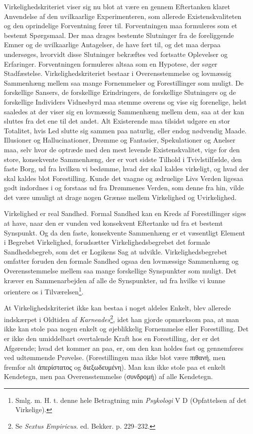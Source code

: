 \documentclass[12pt,a4paper]{book}
\newcommand{\apage}[1]{\marginnote{\footnotesize\textit{[#1]}}}
\begin{document}
Virkelighedskriteriet viser sig nu blot at være en gennem Eftertanken
klaret Anvendelse af den uvilkaarlige Experimenteren, som allerede
Existenskvaliteten og den oprindelige Forventning fører til.
Forventningen maa formuleres som et bestemt Spørgsmaal. Der maa drages
bestemte Slutninger fra de foreliggende Emner og de uvilkaarlige
Antagelser, de have ført til, og det maa derpaa undersøges, hvorvidt
disse Slutninger bekræftes ved fortsatte Oplevelser og Erfaringer.
Forventningen formuleres altsaa som en Hypotese, der søger Stadfæstelse.
Virkelighedskriteriet bestaar i Overensstemmelse og lovmæssig
Sammenhæng mellem saa mange Fornemmelser og Forestillinger som muligt.
De forskellige Sansers, de forskellige Erindringers, de forskellige
Slutningers og de forskellige Individers Vidnesbyrd maa stemme overens
og vise sig forenelige, helst saaledes at der viser sig en lovmæssig
Sammenhæng mellem dem, saa at der kan sluttes fra det ene til det andet.
Alt Existerende maa tilsidst udgøre \apage{104} en stor Totalitet, hvis Led slutte
sig sammen paa naturlig, eller endog nødvendig Maade. Illusioner og
Hallucinationer, Drømme og Fantasier, Spekulationer og Anelser maa, selv
hvor de optræde med den mest levende Existenskvalitet, vige for den
store, konsekvente Sammenhæng, der er vort sidste Tilhold i
Tvivlstilfælde, den faste Borg, ud fra hvilken vi bedømme, hvad der skal
kaldes virkeligt, og hvad der skal kaldes blot Forestilling. Kunde det
vaagne og ædruelige Livs Verden ligesaa godt indordnes i og forstaas ud
fra Drømmenes Verden, som denne fra hin, vilde det være umuligt at drage
nogen Grænse mellem Virkelighed og Uvirkelighed.

Virkelighed er real Sandhed. Formal Sandhed kan en Kreds af
Forestillinger siges at have, naar den er vunden ved konsekvent
Eftertanke ud fra et bestemt Synspunkt. Og da den faste, konsekvente
Sammenhæng er et væsentligt Element i Begrebet Virkelighed, forudsætter
Virkelighedsbegrebet det formale Sandhedsbegreb, som det er Logikens Sag
at udvikle. Virkelighedsbegrebet omfatter foruden den formale Sandhed
ogsaa den lovmæssige Sammenhæng og Overensstemmelse mellem saa mange
forskellige Synspunkter som muligt. Det kræver en Sammenarbejden af alle
de Synspunkter, ud fra hvilke vi kunne orientere os i
Tilværelsen\footnote{Smlg. m. H. t. denne hele Betragtning min
\emph{Psykologi} V D (Opfattelsen af det Virkelige).}.

At Virkelighedskriteriet ikke kan bestaa i noget aldeles Enkelt, blev
allerede indskærpet i Oldtiden af \emph{Karneades}\footnote{Se
\emph{Sextus Empiricus}. ed. Bekker. p. 229--232.}, idet han gjorde
opmærksom paa, at man ikke kan stole paa nogen enkelt og øjeblikkelig
Fornemmelse eller Forestilling. Det er ikke den umiddelbart overtalende
Kraft hos en Forestilling, der er det Afgørende; hvad det kommer an paa,
er, om den kan holdes fast og gennemføres ved udtømmende Prøvelse.
(Forestillingen maa ikke blot være πιθανή, men fremfor alt ἀπερίστατος og
διεξωδευμένη). Man kan ikke stole paa et enkelt Kendetegn, men paa
Overensstemmelse (συνδρομή) af alle Kendetegn.
\end{document}
